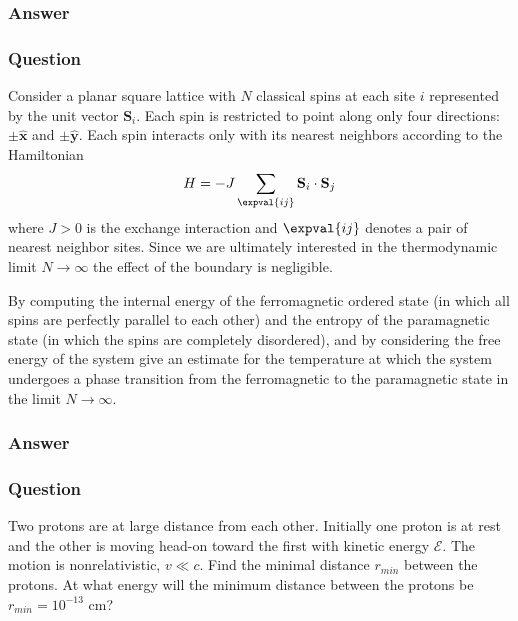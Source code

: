 \subsubsection{Answer}



\subsubsection{Question}
Consider a planar square lattice with $N$ classical spins at each site $i$ represented by the unit vector $\mathbf{S}_i$. Each spin is restricted to point along only four directions: $\pm\hat{\mathbf{x}}$ and $\pm\hat{\mathbf{y}}$. Each spin interacts only with its nearest neighbors according to the Hamiltonian $$H = -J\sum_{\expval{ij}}\mathbf{S}_i\cdot\mathbf{S}_j$$ where $J > 0$ is the exchange interaction and $\expval{ij}$ denotes a pair of nearest neighbor sites. Since we are ultimately interested in the thermodynamic limit $N\to\infty$ the effect of the boundary is negligible.

By computing the internal energy of the ferromagnetic ordered state (in which all spins are perfectly parallel to each other) and the entropy of the paramagnetic state (in which the spins are completely disordered), and by considering the free energy of the system give an estimate for the temperature at which the system undergoes a phase transition from the ferromagnetic to the paramagnetic state in the limit $N\to\infty$.
\subsubsection{Answer}



\subsubsection{Question}
Two protons are at large distance from each other. Initially one proton is at rest and the other is moving head-on toward the first with kinetic energy $\mathcal{E}$. The motion is nonrelativistic, $v\ll c$. Find the minimal distance $r_{min}$ between the protons. At what energy will the minimum distance between the protons be $r_{min}= 10^{-13}$ cm?
